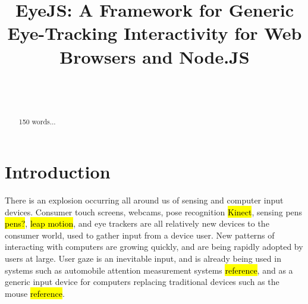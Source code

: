 \documentclass{sigchi}
\begin{document}
\title{EyeJS: A Framework for Generic Eye-Tracking Interactivity for Web Browsers and Node.JS}

\author{%
  \\
  \\
}

\maketitle



\begin{abstract}
  150 words...
\end{abstract}









\section{Introduction}
There is an explosion occurring all around us of sensing and computer input devices. Consumer touch screens, webcams, pose recognition \hl{Kinect}, sensing pens \hl{pens?}, \hl{leap motion}, and eye trackers are all relatively new devices to the consumer world, used to gather input from a device user. New patterns of interacting with computers are growing quickly, and are being rapidly adopted by users at large. User gaze is an inevitable input, and is already being used in systems such as automobile attention measurement systems \hl{reference}, and as a generic input device for computers replacing traditional devices such as the mouse \hl{reference}.
\end{document}
